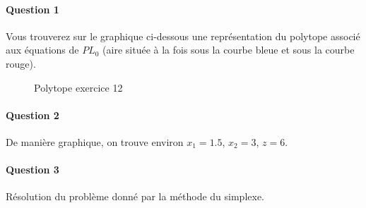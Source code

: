 \paragraph{Question 1}

Vous trouverez sur le graphique ci-dessous une représentation du
polytope associé aux équations de $PL_0$ (aire située à la fois sous la courbe
bleue et sous la courbe rouge).

\begin{figure}[h!]
\centering
{}
\caption{Polytope exercice 12}
\end{figure}

\paragraph{Question 2}
De manière graphique, on trouve environ $x_1 = 1.5$, $x_2 = 3$, $z = 6$.

\paragraph{Question 3}

Résolution du problème donné par la méthode du simplexe.

